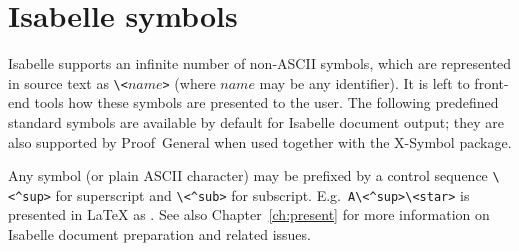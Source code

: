 

\chapter{Isabelle symbols}\label{app:symbols}

Isabelle supports an infinite number of non-ASCII symbols, which are
represented in source text as \verb,\<,$name$\verb,>, (where $name$ may be any
identifier).  It is left to front-end tools how these symbols are presented to
the user.  The following predefined standard symbols are available by default
for Isabelle document output; they are also supported by Proof~General when
used together with the X-Symbol package.

\begin{center}
    
\end{center}

Any symbol (or plain ASCII character) may be prefixed by a control sequence
\verb,\<^sup>, for superscript and \verb,\<^sub>, for subscript.  E.g.\ 
\verb,A\<^sup>\<star>, is presented in {\LaTeX} as
.  See also Chapter~\ref{ch:present} for more
information on Isabelle document preparation and related issues.


